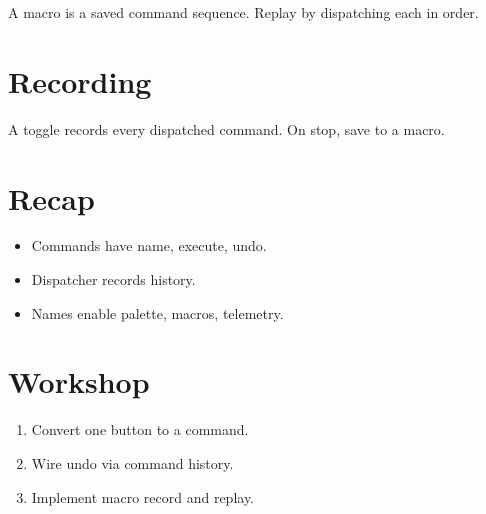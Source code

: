 A macro is a saved command sequence. Replay by dispatching
each in order.

\section{Recording}

A toggle records every dispatched command. On stop, save
to a macro.

\section{Recap}

\begin{recap}
\begin{itemize}[leftmargin=*]
  \item Commands have name, execute, undo.
  \item Dispatcher records history.
  \item Names enable palette, macros, telemetry.
\end{itemize}
\end{recap}

\section*{Workshop}

\begin{enumerate}[leftmargin=*]
  \item Convert one button to a command.
  \item Wire undo via command history.
  \item Implement macro record and replay.
\end{enumerate}
